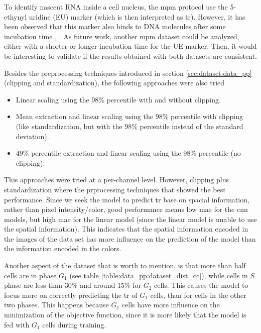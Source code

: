 \glsresetall
\graphicspath{{./Sections/Dataset/Resources/}}

To identify nascent RNA inside a cell nucleus, the \gls{mpm} protocol use the 5-ethynyl uridine (EU) marker (which is then interpreted as \gls{tr}). However, it has been observed that this marker also binds to DNA molecules after some incubation time \cite{jao2008exploring}, \cite{bao2018capturing}. As future work, another \gls{mpm} dataset could be analyzed, either with a shorter or longer incubation time for the UE marker. Then, it would be interesting to validate if the results obtained with both datasets are consistent.

Besides the preprocessing techniques introduced in section \ref{sec:dataset:data_pp} (clipping and standardization), the following approaches were also tried

\begin{itemize}
  \item Linear scaling using the $98\%$ percentile with and without clipping.
  \item Mean extraction and linear scaling using the $98\%$ percentile with clipping (like standardization, but with the $98\%$ percentile instead of the standard deviation).
  \item $49\%$ percentile extraction and linear scaling using the $98\%$ percentile (no clipping).
\end{itemize}

\noindent This approaches were tried at a per-channel level. However, clipping plus standardization where the prprocessing techniques that showed the best performance. Since we seek the model to predict \gls{tr} base on spacial information, rather than pixel intensity/color, good performance means low \gls{mae} for the \gls{cnn} models, but high \gls{mae} for the linear model (since the linear model is unable to use the spatial information). This indicates that the spatial information encoded in the images of the data set has more influence on the prediction of the model than the information encoded in the colors.

Another aspect of the dataset that is worth to mention, is that more than half cells are in phase $G_1$ (see table \ref{table:data_pp:dataset_dist_cc}), while cells in $S$ phase are less than $30\%$ and around $15\%$ for $G_2$ cells. This causes the model to focus more on correctly predicting the \gls{tr} of $G_1$ cells, than for cells in the other two phases. This happens because $G_1$ cells have more influence on the minimization of the objective function, since it is more likely that the model is fed with $G_1$ cells during training.

